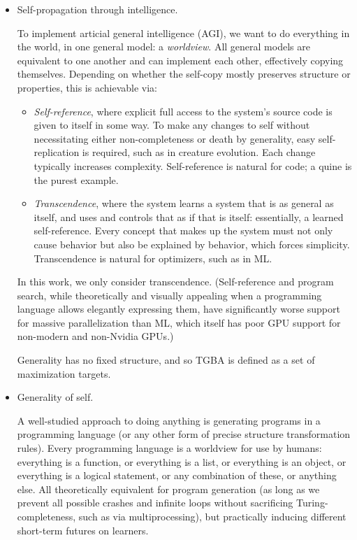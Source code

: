 \documentclass{article}
\begin{document}
\begin{itemize}
\item Self-propagation through intelligence.

To implement articial general intelligence (AGI), we want to do everything in the world, in one general model: a \textit{worldview}. All general models are equivalent to one another and can implement each other, effectively copying themselves. Depending on whether the self-copy mostly preserves structure or properties, this is achievable via:

\begin{itemize}
\item \textit{Self-reference}, where explicit full access to the system's source code is given to itself in some way. To make any changes to self without necessitating either non-completeness or death by generality, easy self-replication is required, such as in creature evolution. Each change typically increases complexity. Self-reference is natural for code; a quine is the purest example.
\item \textit{Transcendence}, where the system learns a system that is as general as itself, and uses and controls that as if that is itself: essentially, a learned self-reference. Every concept that makes up the system must not only cause behavior but also be explained by behavior, which forces simplicity. Transcendence is natural for optimizers, such as in ML.
\end{itemize}

In this work, we only consider transcendence. (Self-reference and program search, while theoretically and visually appealing when a programming language allows elegantly expressing them, have significantly worse support for massive parallelization than ML, which itself has poor GPU support for non-modern and non-Nvidia GPUs.)

Generality has no fixed structure, and so TGBA is defined as a set of maximization targets.

\item Generality of self.

A well-studied approach to doing anything is generating programs in a programming language (or any other form of precise structure transformation rules). Every programming language is a worldview for use by humans: everything is a function, or everything is a list, or everything is an object, or everything is a logical statement, or any combination of these, or anything else. All theoretically equivalent for program generation (as long as we prevent all possible crashes and infinite loops without sacrificing Turing-completeness, such as via multiprocessing), but practically inducing different short-term futures on learners.


\end{itemize}
\end{document}
